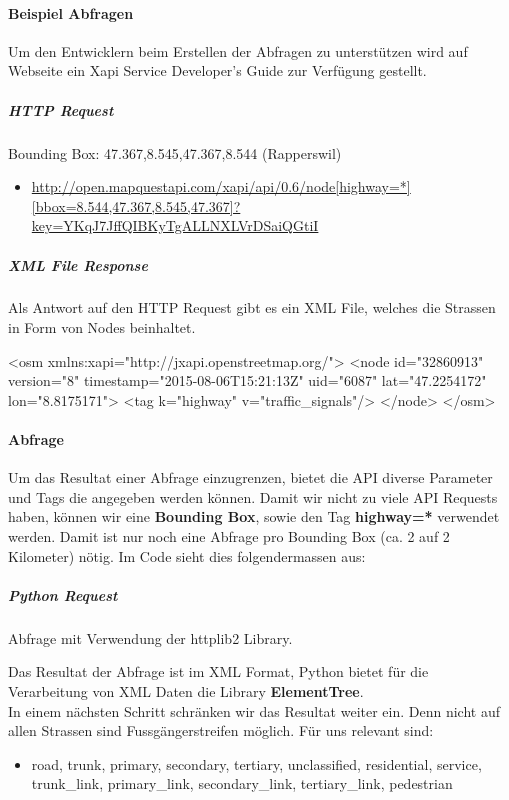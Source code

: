 \paragraph{Beispiel Abfragen}
Um den Entwicklern beim Erstellen der Abfragen zu unterstützen wird auf Webseite \cite{mapquestapi} ein Xapi Service Developer's Guide zur Verfügung gestellt.

\subparagraph{HTTP Request}
Bounding Box:  47.367,8.545,47.367,8.544 (Rapperswil)
\begin{itemize}
	\item \url{http://open.mapquestapi.com/xapi/api/0.6/node[highway=*][bbox=8.544,47.367,8.545,47.367]?key=YKqJ7JffQIBKyTgALLNXLVrDSaiQGtiI}
\end{itemize}

\newpage
\subparagraph{XML File Response}
Als Antwort auf den HTTP Request gibt es ein XML File, welches die Strassen in Form von Nodes beinhaltet.\\

\begin{python}
	<osm xmlns:xapi="http://jxapi.openstreetmap.org/">
	<node id="32860913" version="8"
	timestamp="2015-08-06T15:21:13Z" uid="6087"
	lat="47.2254172" lon="8.8175171">
	<tag k="highway" v="traffic_signals"/>
	</node>
	</osm>
\end{python}



\paragraph{Abfrage}
Um das Resultat einer Abfrage einzugrenzen, bietet die API diverse Parameter und Tags die angegeben werden können. Damit wir nicht zu viele API Requests haben, können wir eine \textbf{Bounding Box}, sowie den Tag \textbf{highway=*} verwendet werden. Damit ist nur noch eine Abfrage pro Bounding Box (ca. 2 auf 2 Kilometer) nötig. Im Code sieht dies folgendermassen aus:
\subparagraph{Python Request} Abfrage mit Verwendung der httplib2 Library. \\ 
\begin{python}
import httplib2

url =  'http://open.mapquestapi.com/xapi/api/0.6/node
		[highway=*][bbox=8.544,47.367,8.545,47.367]?
		key=YKqJ7JffQIBKyTgALLNXLVrDSaiQGtiI}'
resp, content = httplib2.Http().request(url)
\end{python}

Das Resultat der Abfrage ist im XML Format, Python bietet für die Verarbeitung von XML Daten die Library \textbf{ElementTree}.\\
In einem nächsten Schritt schränken wir das Resultat weiter ein. Denn nicht auf allen Strassen sind Fussgängerstreifen möglich. Für uns relevant sind:
\begin{itemize}
	\item road, trunk, primary, secondary, tertiary, unclassified, residential, service, trunk\_link, primary\_link, secondary\_link, tertiary\_link, pedestrian
\end{itemize}

